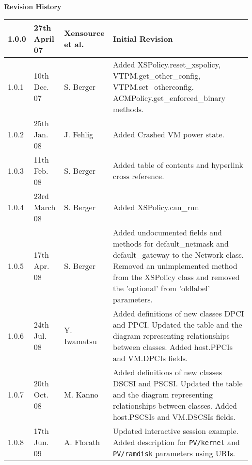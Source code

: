 { \bf Revision History}


\begin{flushleft}
\begin{center}
 \begin{tabular}{|l|l|l|>{\raggedright}p{7cm}|}
  \hline
  1.0.0 & 27th April 07 & Xensource et al. &
     Initial Revision\tabularnewline
  \hline
  1.0.1 & 10th Dec. 07 & S. Berger &
     Added XSPolicy.reset\_xspolicy, VTPM.get\_other\_config,
     VTPM.set\_otherconfig. ACMPolicy.get\_enforced\_binary methods.\tabularnewline
  \hline
  1.0.2 & 25th Jan. 08 & J. Fehlig &
     Added Crashed VM power state.\tabularnewline
  \hline
  1.0.3 & 11th Feb. 08 & S. Berger &
     Added table of contents and hyperlink cross reference.\tabularnewline
  \hline
  1.0.4 & 23rd March 08 & S. Berger &
     Added XSPolicy.can\_run\tabularnewline
  \hline
  1.0.5 & 17th Apr. 08 & S. Berger &
     Added undocumented fields and methods for default\_netmask and
     default\_gateway to the Network class. Removed an unimplemented
     method from the XSPolicy class and removed the 'optional' from
     'oldlabel' parameters.\tabularnewline
  \hline
  1.0.6 & 24th Jul. 08 & Y. Iwamatsu &
     Added definitions of new classes DPCI and PPCI. Updated the table
     and the diagram representing relationships between classes.
     Added host.PPCIs and VM.DPCIs fields.\tabularnewline
  \hline
  1.0.7 & 20th Oct. 08 & M. Kanno &
     Added definitions of new classes DSCSI and PSCSI. Updated the table
     and the diagram representing relationships between classes.
     Added host.PSCSIs and VM.DSCSIs fields.\tabularnewline
  \hline
  1.0.8 & 17th Jun. 09 & A. Florath &
     Updated interactive session example.
     Added description for \texttt{PV/kernel} and \texttt{PV/ramdisk}
     parameters using URIs.\tabularnewline
  \hline
 \end{tabular}
\end{center}
\end{flushleft}
